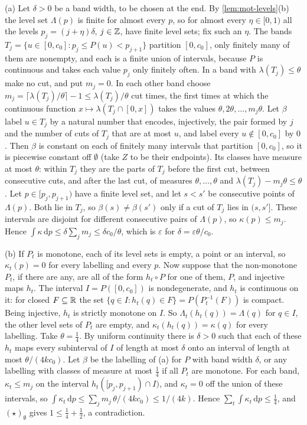 \begin{informalproof}
(a) Let $\delta>0$ be a band width, to be chosen at the end. By \cref{lem:mot-levels}(b) the level set $\Lambda(p)$ is
finite for almost every $p$, so for almost every $\eta\in[0,1)$ all the levels $p_j=(j+\eta)\delta$, $j\in\mathbb{Z}$, have finite level sets; fix
such an $\eta$. The bands $T_j=\{u\in[0,c_0]:p_j\le P(u)<p_{j+1}\}$ partition $[0,c_0]$, only finitely many of them are
nonempty, and each is a finite union of intervals, because $P$ is continuous and takes each value $p_j$ only finitely
often. In a band with $\lambda(T_j)\le\theta$ make no cut, and put $m_j=0$. In each other band choose
$m_j=\lceil\lambda(T_j)/\theta\rceil-1\le\lambda(T_j)/\theta$ cut times, the first times at which the continuous function
$x\mapsto\lambda(T_j\cap[0,x])$ takes the values $\theta,2\theta,\dots,m_j\theta$. Let $\beta$ label $u\in T_j$ by a
natural number that encodes, injectively, the pair formed by $j$ and the number of cuts of $T_j$ that are at most $u$,
and label every $u\notin[0,c_0]$ by $0$. Then $\beta$ is constant on each of finitely many intervals that partition
$[0,c_0]$, so it is piecewise constant off $\emptyset$ (take $Z$ to be their endpoints). Its classes have measure at most
$\theta$: within $T_j$ they are the parts of $T_j$ before the first cut, between consecutive cuts, and after the last
cut, of measures $\theta,\dots,\theta$ and $\lambda(T_j)-m_j\theta\le\theta$.
Let $p\in[p_j,p_{j+1})$ have a finite level set, and let $s<s'$ be consecutive points of $\Lambda(p)$. Both lie in $T_j$,
so $\beta(s)\ne\beta(s')$ only if a cut of $T_j$ lies in $(s,s']$. These intervals are disjoint for different
consecutive pairs of $\Lambda(p)$, so $\kappa(p)\le m_j$. Hence $\int\kappa\,\mathrm dp\le\delta\sum_jm_j\le\delta
c_0/\theta$, which is $\varepsilon$ for $\delta=\varepsilon\theta/c_0$.

(b) If $P_t$ is monotone, each of its level sets is empty, a point or an interval, so $\kappa_t(p)=0$ for every labelling
and every $p$. Now suppose that the non-monotone $P_t$, if there are any, are all of the form $h_t\circ P$ for one of
them, $P$, and injective maps $h_t$. The interval $I=P([0,c_0])$ is nondegenerate, and $h_t$ is continuous on it: for
closed $F\subseteq\mathbb{R}$ the set $\{q\in I:h_t(q)\in F\}=P(P_t^{-1}(F))$ is compact. Being injective, $h_t$ is strictly
monotone on $I$. So $\Lambda_t(h_t(q))=\Lambda(q)$ for $q\in I$, the other level sets of $P_t$ are empty, and
$\kappa_t(h_t(q))=\kappa(q)$ for every labelling. Take $\theta=\frac14$. By uniform continuity there is $\delta>0$ such
that each of these $h_t$ maps every subinterval of $I$ of length at most $\delta$ onto an interval of length at most
$\theta/(4kc_0)$. Let $\beta$ be the labelling of (a) for $P$ with band width $\delta$, or any labelling with classes of
measure at most $\frac14$ if all $P_t$ are monotone. For each band, $\kappa_t\le m_j$ on the interval
$h_t([p_j,p_{j+1})\cap I)$, and $\kappa_t=0$ off the union of these intervals, so
$\int\kappa_t\,\mathrm dp\le\sum_jm_j\,\theta/(4kc_0)\le1/(4k)$. Hence $\sum_t\int\kappa_t\,\mathrm dp\le\frac14$, and
$(\star)_\emptyset$ gives $1\le\frac14+\frac12$, a contradiction.


\end{informalproof}
